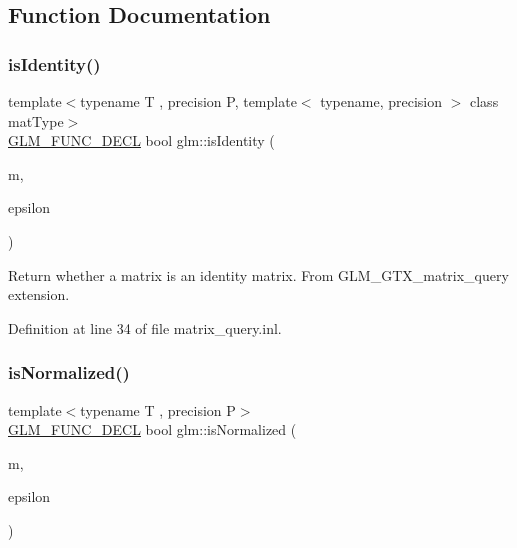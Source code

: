 \subsection{Function Documentation}
\mbox{\label{group__gtx__matrix__query_gafc1ce12c738b8c5d007179e615609330}} 
\subsubsection{\texorpdfstring{isIdentity()}{isIdentity()}}
{\footnotesize\ttfamily template$<$typename T , precision P, template$<$ typename, precision $>$ class mat\+Type$>$ \\
\mbox{\hyperlink{setup_8hpp_ab2d052de21a70539923e9bcbf6e83a51}{G\+L\+M\+\_\+\+F\+U\+N\+C\+\_\+\+D\+E\+CL}} bool glm\+::is\+Identity (\begin{DoxyParamCaption}\item[{mat\+Type$<$ T, P $>$ const \&}]{m,  }\item[{T const \&}]{epsilon }\end{DoxyParamCaption})}

Return whether a matrix is an identity matrix. From G\+L\+M\+\_\+\+G\+T\+X\+\_\+matrix\+\_\+query extension. 

Definition at line 34 of file matrix\+\_\+query.\+inl.

\mbox{\label{group__gtx__matrix__query_ga11a8d5cdb36496b85f61e4f5f7f2602c}} 
\subsubsection{\texorpdfstring{isNormalized()}{isNormalized()}\hspace{0.1cm}{\footnotesize\ttfamily [1/3]}}
{\footnotesize\ttfamily template$<$typename T , precision P$>$ \\
\mbox{\hyperlink{setup_8hpp_ab2d052de21a70539923e9bcbf6e83a51}{G\+L\+M\+\_\+\+F\+U\+N\+C\+\_\+\+D\+E\+CL}} bool glm\+::is\+Normalized (\begin{DoxyParamCaption}\item[{\mbox{\hyperlink{structglm_1_1tmat2x2}{tmat2x2}}$<$ T, P $>$ const \&}]{m,  }\item[{T const \&}]{epsilon }\end{DoxyParamCaption})}

